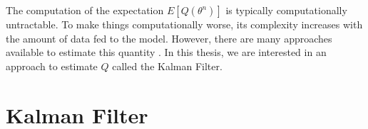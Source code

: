 \documentclass[mscthesis]{usiinfthesis}
\begin{document}
The computation of the expectation $E[Q(\theta^n)]$ is typically computationally untractable. To make things computationally worse, its complexity increases with the amount of data fed to the model. However, there are many approaches available to estimate this quantity \cite{book:EMBook}. In this thesis, we are interested in an approach to estimate $Q$ called the Kalman Filter.

%
%


%
%
%
%



\section{Kalman Filter}
\label{sec:kalman}
\end{document}
